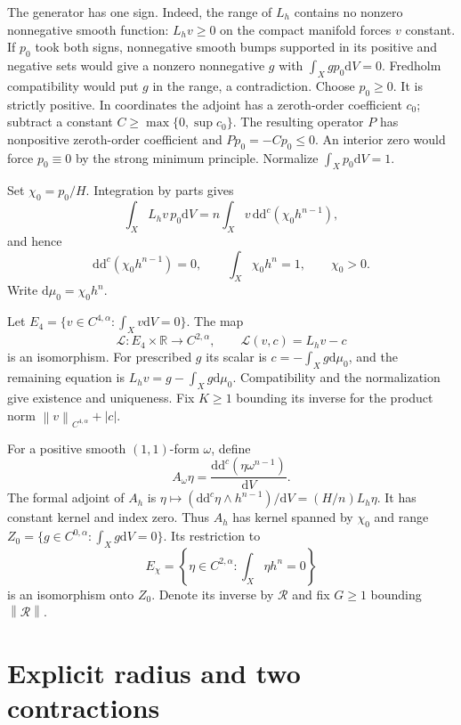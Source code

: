 \documentclass[11pt]{article}
\newcommand{\ddc}{\mathrm{d}\mathrm{d}^c}
\newcommand{\norm}[1]{\left\|#1\right\|}
\begin{document}
The generator has one sign. Indeed, the range of $L_h$ contains no
nonzero nonnegative smooth function: $L_hv\ge0$ on the compact manifold
forces $v$ constant. If $p_0$ took both signs, nonnegative smooth bumps
supported in its positive and negative sets would give a nonzero
nonnegative $g$ with $\int_Xgp_0\mathrm dV=0$. Fredholm compatibility
would put $g$ in the range, a contradiction. Choose $p_0\ge0$.
It is strictly positive. In coordinates the adjoint has a zeroth-order
coefficient $c_0$; subtract a constant $C\ge\max\{0,\sup c_0\}$.
The resulting operator $P$ has nonpositive zeroth-order coefficient
and $Pp_0=-Cp_0\le0$. An interior zero would force $p_0\equiv0$
by the strong minimum principle. Normalize $\int_Xp_0\mathrm dV=1$.

Set $\chi_0=p_0/H$. Integration by parts gives
\[
 \int_XL_hv\,p_0\mathrm dV
       =n\int_Xv\,\ddc(\chi_0h^{n-1}),
\]
and hence
\begin{equation}\label{eq:baseline}
 \ddc(\chi_0h^{n-1})=0,\qquad
 \int_X\chi_0h^n=1,\qquad \chi_0>0.
\end{equation}
Write $\mathrm d\mu_0=\chi_0h^n$.

Let $E_4=\{v\in C^{4,\alpha}:\int_Xv\mathrm dV=0\}$. The map
\[
 \mathcal L:E_4\times\mathbb R\longrightarrow C^{2,\alpha},
 \qquad \mathcal L(v,c)=L_hv-c
\]
is an isomorphism. For prescribed $g$ its scalar is
$c=-\int_Xg\mathrm d\mu_0$, and the remaining equation is
$L_hv=g-\int_Xg\mathrm d\mu_0$. Compatibility and the normalization
give existence and uniqueness. Fix $K\ge1$ bounding its inverse for
the product norm $\norm{v}_{C^{4,\alpha}}+|c|$.

For a positive smooth $(1,1)$-form $\omega$, define
\[
 A_\omega\eta=\frac{\ddc(\eta\omega^{n-1})}{\mathrm dV}.
\]
The formal adjoint of $A_h$ is
$\eta\mapsto(\ddc\eta\wedge h^{n-1})/\mathrm dV=(H/n)L_h\eta$.
It has constant kernel and index zero. Thus $A_h$ has kernel spanned
by $\chi_0$ and range
$Z_0=\{g\in C^{0,\alpha}:\int_Xg\mathrm dV=0\}$.
Its restriction to
\[
 E_\chi=\left\{\eta\in C^{2,\alpha}:\int_X\eta h^n=0\right\}
\]
is an isomorphism onto $Z_0$. Denote its inverse by $\mathcal R$ and
fix $G\ge1$ bounding $\norm{\mathcal R}$.

\section{Explicit radius and two contractions}\label{sec:constants}
\end{document}
